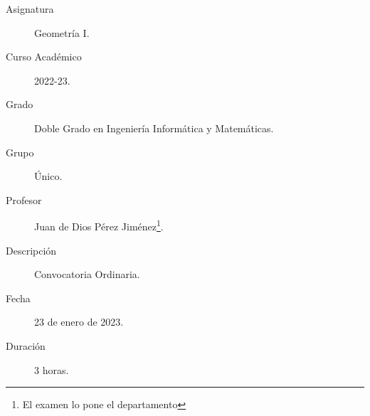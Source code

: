 \documentclass[12pt]{article}
\begin{document}

    
    

    \begin{description}
        \item[Asignatura] Geometría I.
        \item[Curso Académico] 2022-23.
        \item[Grado] Doble Grado en Ingeniería Informática y Matemáticas.
        \item[Grupo] Único.
        \item[Profesor] Juan de Dios Pérez Jiménez\footnote{El examen lo pone el departamento}.
        \item[Descripción] Convocatoria Ordinaria.
        \item[Fecha] 23 de enero de 2023.
        \item[Duración] 3 horas.
    
    \end{description}
    \newpage
    
\end{document}
